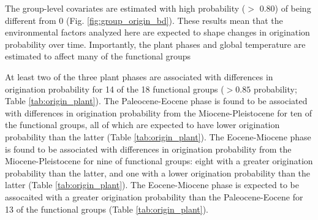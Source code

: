 \documentclass[12pt,letterpaper]{article}
\begin{document}
The group-level covariates are estimated with high probability (\(>\) 0.80) of being different from 0 (Fig. \ref{fig:group_origin_bd}). These results mean that the environmental factors analyzed here are expected to shape changes in origination probability over time. Importantly, the plant phases and global temperature are estimated to affect many of the functional groups

At least two of the three plant phases are associated with differences in origination probability for 14 of the 18 functional groups (\(> 0.85\) probability; Table \ref{tab:origin_plant}). The Paleocene-Eocene phase is found to be associated with differences in origination probability from the Miocene-Pleistocene for ten of the functional groups, all of which are expected to have lower origination probability than the latter (Table \ref{tab:origin_plant}). The Eocene-Miocene phase is found to be associated with differences in origination probability from the Miocene-Pleistocene for nine of functional groups: eight with a greater origination probability than the latter, and one with a lower origination probability than the latter (Table \ref{tab:origin_plant}). The Eocene-Miocene phase is expected to be assocaited with a greater origination probability than the Paleocene-Eocene for 13 of the functional groups (Table \ref{tab:origin_plant}). 
\end{document}
